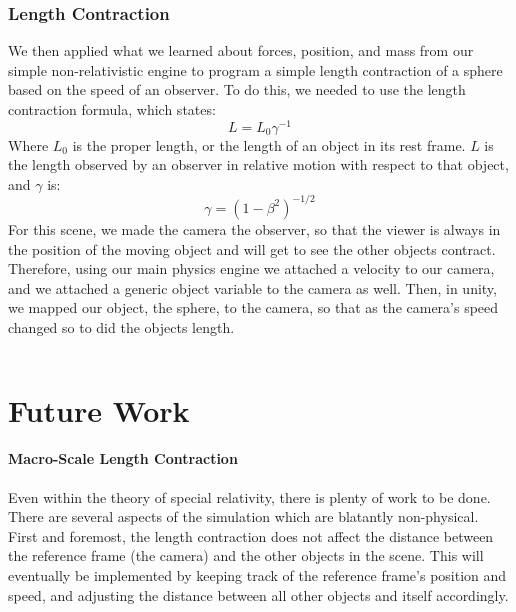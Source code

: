 \documentclass[12pt]{article}
\begin{document}
\subsubsection{Length Contraction}
We then applied what we learned about forces, position, and mass from our simple non-relativistic engine to program a simple length contraction of a sphere based on the speed of an observer. To do this, we needed to use the length contraction formula, which states:
\begin{equation}
L = L_0\gamma^{-1}
\end{equation}
Where $L_0$ is the proper length, or the length of an object in its rest frame. $L$ is the length observed by an observer in relative motion with respect to that object, and $\gamma$ is:
\begin{equation}
\gamma = (1-\beta^2)^{-1/2}
\end{equation}
For this scene, we made the camera the observer, so that the viewer is always in the position of the moving object and will get to see the other objects contract. Therefore, using our main physics engine we attached a velocity to our camera, and we attached a generic object variable to the camera as well. Then, in unity, we mapped our object, the sphere, to the camera, so that as the camera's speed changed so to did the objects length.

\inputminted[firstline=2,lastline=10,linenos,fontsize=\footnotesize,bgcolor=codebg]{csharp}{../unity/Assets/Scripts/CameraFollow.cs}



\section{Future Work}

\paragraph{Macro-Scale Length Contraction}
Even within the theory of special relativity, there is plenty of work to be done. There are several aspects of the simulation which are blatantly non-physical. First and foremost, the length contraction does not affect the distance between the reference frame (the camera) and the other objects in the scene. This will eventually be implemented by keeping track of the reference frame's position and speed, and adjusting the distance between all other objects and itself accordingly.
\end{document}
